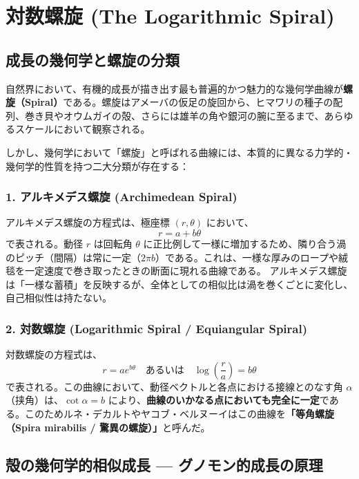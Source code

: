 \chapter{対数螺旋 (The Logarithmic Spiral)}

\section{成長の幾何学と螺旋の分類}

自然界において、有機的成長が描き出す最も普遍的かつ魅力的な幾何学曲線が\textbf{螺旋（Spiral）}である。螺旋はアメーバの仮足の旋回から、ヒマワリの種子の配列、巻き貝やオウムガイの殻、さらには雄羊の角や銀河の腕に至るまで、あらゆるスケールにおいて観察される。

しかし、幾何学において「螺旋」と呼ばれる曲線には、本質的に異なる力学的・幾何学的性質を持つ二大分類が存在する：

\subsection{1. アルキメデス螺旋 (Archimedean Spiral)}
アルキメデス螺旋の方程式は、極座標 $(r, \theta)$ において、
\begin{equation}
    r = a + b\theta
\end{equation}
で表される。動径 $r$ は回転角 $\theta$ に正比例して一様に増加するため、隣り合う渦のピッチ（間隔）は常に一定（$2\pi b$）である。これは、一様な厚みのロープや絨毯を一定速度で巻き取ったときの断面に現れる曲線である。
アルキメデス螺旋は「一様な蓄積」を反映するが、全体としての相似比は渦を巻くごとに変化し、自己相似性は持たない。

\subsection{2. 対数螺旋 (Logarithmic Spiral / Equiangular Spiral)}
対数螺旋の方程式は、
\begin{equation}
    r = a e^{b\theta} \quad \text{あるいは} \quad \log\left(\frac{r}{a}\right) = b\theta
\end{equation}
で表される。この曲線において、動径ベクトルと各点における接線とのなす角 $\alpha$（挟角）は、$\cot \alpha = b$ により、\textbf{曲線のいかなる点においても完全に一定}である。このためルネ・デカルトやヤコブ・ベルヌーイはこの曲線を\textbf{「等角螺旋（Spira mirabilis / 驚異の螺旋）」}と呼んだ。

\section{殻の幾何学的相似成長 --- グノモン的成長の原理}

